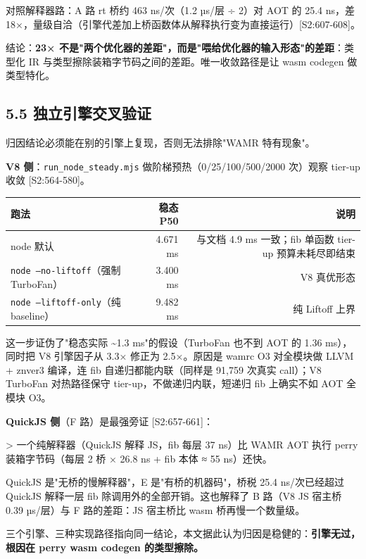 \documentclass[11pt, a4paper]{article}
\begin{document}
对照解释器路：A 路 rt 桥约 463 ns/次（1.2 µs/层 ÷ 2）对 AOT 的 25.4 ns，差 18×，量级自洽（引擎代差加上桥函数体从解释执行变为直接运行）[S2:607-608]。


结论：\textbf{23× 不是"两个优化器的差距"，而是"喂给优化器的输入形态"的差距}：类型化 IR 与类型擦除装箱字节码之间的差距。唯一收敛路径是让 wasm codegen 做类型特化。


\subsection{5.5 独立引擎交叉验证}

归因结论必须能在别的引擎上复现，否则无法排除"WAMR 特有现象"。


\textbf{V8 侧}：\texttt{run\_node\_steady.mjs} 做阶梯预热（0/25/100/500/2000 次）观察 tier-up 收敛 [S2:564-580]。


\begin{center}\small\begin{tabular}{lrr}
\toprule
跑法 & 稳态 P50 & 说明 \\
\midrule
node 默认 & 4.671 ms & 与文档 4.9 ms 一致；fib 单函数 tier-up 预算未耗尽即结束 \\
\texttt{node --no-liftoff}（强制 TurboFan） & 3.400 ms & V8 真优形态 \\
\texttt{node --liftoff-only}（纯 baseline） & 9.482 ms & 纯 Liftoff 上界 \\
\bottomrule
\end{tabular}\end{center}


这一步证伪了"稳态实际 \textasciitilde{}1.3 ms"的假设（TurboFan 也不到 AOT 的 1.36 ms），同时把 V8 引擎因子从 3.3× 修正为 2.5×。原因是 wamrc O3 对全模块做 LLVM + znver3 编译，连 fib 自递归都能内联（同样是 91,759 次真实 call）；V8 TurboFan 对热路径保守 tier-up，不做递归内联，短递归 fib 上确实不如 AOT 全模块 O3。


\textbf{QuickJS 侧}（F 路）是最强旁证 [S2:657-661]：


> 一个纯解释器（QuickJS 解释 JS，fib 每层 37 ns）比 WAMR AOT 执行 perry 装箱字节码（每层 2 桥 × 26.8 ns + fib 本体 ≈ 55 ns）还快。


QuickJS 是"无桥的慢解释器"，E 是"有桥的机器码"，桥税 25.4 ns/次已经超过 QuickJS 解释一层 fib 除调用外的全部开销。这也解释了 B 路（V8 JS 宿主桥 0.39 µs/层）与 F 路的差距：JS 宿主桥比 wasm 桥再慢一个数量级。


三个引擎、三种实现路径指向同一结论，本文据此认为归因是稳健的：\textbf{引擎无过，根因在 perry wasm codegen 的类型擦除。}
\end{document}
